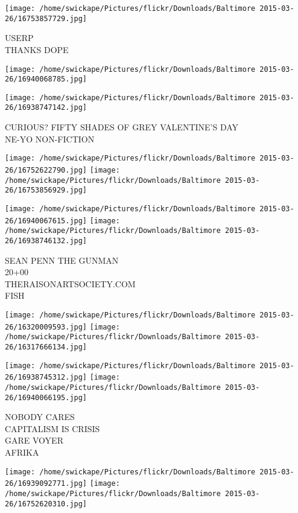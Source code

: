 \documentclass[10pt,letterpaper]{article}
\begin{document}
\vspace{0.25in}
\texttt{[image: /home/swickape/Pictures/flickr/Downloads/Baltimore 2015-03-26/16753857729.jpg]}

USERP\\
THANKS DOPE
\pagebreak

\texttt{[image: /home/swickape/Pictures/flickr/Downloads/Baltimore 2015-03-26/16940068785.jpg]}

\vspace{0.25in}
\texttt{[image: /home/swickape/Pictures/flickr/Downloads/Baltimore 2015-03-26/16938747142.jpg]}

CURIOUS?  FIFTY SHADES OF GREY VALENTINE'S DAY\\
NE{-}YO NON{-}FICTION
\pagebreak

\texttt{[image: /home/swickape/Pictures/flickr/Downloads/Baltimore 2015-03-26/16752622790.jpg]}
\texttt{[image: /home/swickape/Pictures/flickr/Downloads/Baltimore 2015-03-26/16753856929.jpg]}

\texttt{[image: /home/swickape/Pictures/flickr/Downloads/Baltimore 2015-03-26/16940067615.jpg]}
\texttt{[image: /home/swickape/Pictures/flickr/Downloads/Baltimore 2015-03-26/16938746132.jpg]}

SEAN PENN THE GUNMAN\\
20+00\\
THERAISONARTSOCIETY.COM\\
FISH
\pagebreak

\texttt{[image: /home/swickape/Pictures/flickr/Downloads/Baltimore 2015-03-26/16320009593.jpg]}
\texttt{[image: /home/swickape/Pictures/flickr/Downloads/Baltimore 2015-03-26/16317666134.jpg]}

\texttt{[image: /home/swickape/Pictures/flickr/Downloads/Baltimore 2015-03-26/16938745312.jpg]}
\texttt{[image: /home/swickape/Pictures/flickr/Downloads/Baltimore 2015-03-26/16940066195.jpg]}

NOBODY CARES\\
CAPITALISM IS CRISIS\\
GARE VOYER\\
AFRIKA
\pagebreak

\texttt{[image: /home/swickape/Pictures/flickr/Downloads/Baltimore 2015-03-26/16939092771.jpg]}
\texttt{[image: /home/swickape/Pictures/flickr/Downloads/Baltimore 2015-03-26/16752620310.jpg]}
\end{document}
